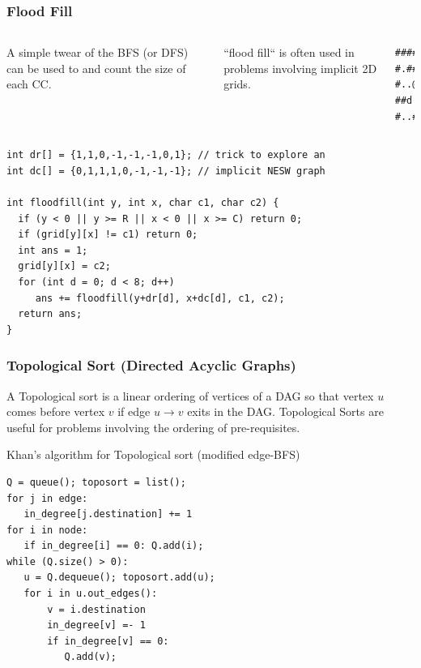 \documentclass{beamer}
\begin{document}
\begin{frame}
  \frametitle{Flood Fill}
  {\smaller
    \begin{columns}[T]
      A simple twear of the BFS (or DFS) can be used to
       and count the size of each CC.
      
      \medskip
      
      ``flood fill`` is often used in problems involving implicit 2D
      grids.
\begin{verbatim}
####..#
#.###.#
#..@.##
##d.###
#..####
\end{verbatim}
    \end{columns}

  \begin{exampleblock}{}
\begin{verbatim}
int dr[] = {1,1,0,-1,-1,-1,0,1}; // trick to explore an
int dc[] = {0,1,1,1,0,-1,-1,-1}; // implicit NESW graph

int floodfill(int y, int x, char c1, char c2) {
  if (y < 0 || y >= R || x < 0 || x >= C) return 0;
  if (grid[y][x] != c1) return 0;
  int ans = 1;
  grid[y][x] = c2;
  for (int d = 0; d < 8; d++)
     ans += floodfill(y+dr[d], x+dc[d], c1, c2);
  return ans;
}
\end{verbatim}
  \end{exampleblock}
  }
\end{frame}

\begin{frame}
  \frametitle{Topological Sort (Directed Acyclic Graphs)} 

  {\smaller 
    A Topological sort is a linear ordering of vertices of a DAG so
    that vertex $u$ comes before vertex $v$ if edge $u \rightarrow v$
    exits in the DAG.  Topological Sorts are useful for problems
    involving the ordering of pre-requisites.

    \begin{exampleblock}{Khan's algorithm for Topological sort (modified edge-BFS)}
\begin{verbatim}
Q = queue(); toposort = list();
for j in edge:
   in_degree[j.destination] += 1
for i in node:
   if in_degree[i] == 0: Q.add(i);
while (Q.size() > 0):
   u = Q.dequeue(); toposort.add(u);
   for i in u.out_edges():
       v = i.destination
       in_degree[v] =- 1
       if in_degree[v] == 0:
          Q.add(v);
\end{verbatim}
    \end{exampleblock}

  }
\end{frame}
\end{document}
